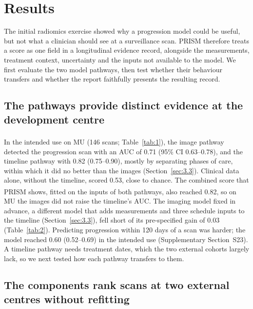 \documentclass[largeformat]{interact} %
\newcommand{\expl}{\textsuperscript{\textdagger}}
\begin{document}
\section{Results}\label{sec:3}

The initial radiomics exercise showed why a progression model could be useful, but not what a clinician should see at a
surveillance scan. PRISM therefore treats a score as one field in a longitudinal evidence record, alongside the
measurements, treatment context, uncertainty and the inputs not available to the model. We first evaluate the two
model pathways, then test whether their behaviour transfers and whether the report faithfully presents the resulting
record.

\subsection{The pathways provide distinct evidence at the development centre}\label{sec:3.1}

In the intended use on MU (146 scans; Table~\ref{tab:1}), the image pathway\expl{} detected the progression scan
with an AUC of 0.71 (95\% CI 0.63--0.78), and the timeline pathway with 0.82 (0.75--0.90), mostly by separating
phases of care, within which it did no better than the images (Section~\ref{sec:3.3}). Clinical data alone, without
the timeline, scored 0.53, close to chance. The combined score that PRISM shows, fitted on the inputs of both
pathways\expl, also reached 0.82, so on MU the images did not raise the timeline's AUC. The imaging model fixed in
advance, a different model that adds measurements and three schedule inputs to the timeline (Section~\ref{sec:3.3}),
fell short of its pre-specified gain of 0.03 (Table~\ref{tab:2}). Predicting progression within 120 days of a scan was harder;
the model reached 0.60 (0.52--0.69) in the intended use (Supplementary Section~S23). A timeline pathway needs treatment dates, which the two
external cohorts largely lack, so we next tested how each pathway transfers to them.

\subsection{The components rank scans at two external centres without refitting}\label{sec:3.2}
\end{document}
